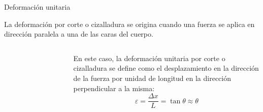 \documentclass[11pt,handout,aspectratio=1610]{beamer}
\begin{document}
\begin{frame}{Deformación unitaria}

    La deformación por corte o cizalladura se origina cuando una fuerza se aplica en dirección paralela a una de las caras del cuerpo.

    \begin{columns}
        \begin{column}{0.5\textwidth}
            \begin{figure}
                \centering
                \begin{subfigure}{\textwidth}
                    \centering
                    \includegraphics{../figs/mechanics_stress_strain-1.pdf}
                \end{subfigure}
                \\
                \begin{subfigure}{\textwidth}
                    \centering
                    \includegraphics{../figs/mechanics_stress_strain-2.pdf}
                \end{subfigure}
            \end{figure}
        \end{column}
        \begin{column}{0.5\textwidth}
            En este caso, la deformación unitaria por corte o cizalladura se define como el desplazamiento en la dirección de la fuerza por unidad de longitud en la dirección perpendicular a la misma: $$ \varepsilon = \frac{\Delta x}{L} = \tan \theta \approx \theta $$
        \end{column}
    \end{columns}

\end{frame}
\end{document}

